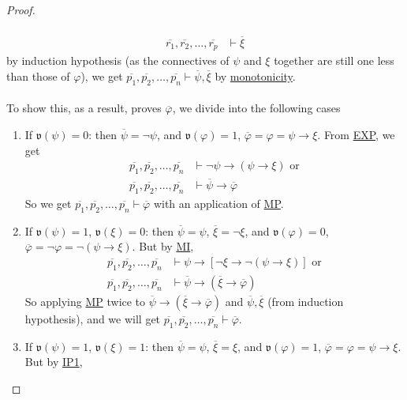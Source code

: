 \documentclass{treatise}
\begin{document}
\begin{proof}
\begin{enumerate}
\begin{align*}
        \\
        \overline{r_1}, \overline{r_2}, \hdots, \overline{r_p} & \vdash \overline{\xi}
    \end{align*}
    by induction hypothesis (as the connectives of $\psi$ and $\xi$ together are still one less than those of $\varphi$), we get $\overline{p_1}, \overline{p_2}, \hdots, \overline{p_n} \vdash \overline{\psi}, \overline{\xi}$ by \hyperref[logic-proof-props]{monotonicity}.
    \\
    \\
    To show this, as a result, proves $\overline{\varphi}$, we divide into the following cases
    \begin{enumerate}
        \item If $\mathfrak{v}(\psi) = 0$: then $\overline{\psi} = \neg \psi$, and $\mathfrak{v}(\varphi) = 1$, $\overline{\varphi} = \varphi = \psi \to \xi$. From \hyperref[HPL-T-EXP]{EXP}, we get
        \begin{align*}
            \overline{p_1}, \overline{p_2}, \hdots, \overline{p_n} & \vdash \neg \psi \to (\psi \to \xi) \mbox{ or}
            \\
            \overline{p_1}, \overline{p_2}, \hdots, \overline{p_n} & \vdash \overline{\psi} \to \overline{\varphi}
        \end{align*}
        So we get $\overline{p_1}, \overline{p_2}, \hdots, \overline{p_n} \vdash \overline{\varphi}$ with an application of \hyperref[HPL-R-MP]{MP}.
        \item If $\mathfrak{v}(\psi) = 1$, $\mathfrak{v}(\xi) = 0$: then $\overline{\psi} = \psi$, $\overline{\xi} = \neg \xi$, and $\mathfrak{v}(\varphi) = 0$, $\overline{\varphi} = \neg \varphi = \neg (\psi \to \xi)$. But by \hyperref[HPL-T-MI]{MI},
        \begin{align*}
            \overline{p_1}, \overline{p_2}, \hdots, \overline{p_n} & \vdash \psi \to [\neg \xi \to \neg (\psi \to \xi)] \mbox{ or}
            \\
            \overline{p_1}, \overline{p_2}, \hdots, \overline{p_n} & \vdash \overline{\psi} \to (\overline{\xi} \to \overline{\varphi})
        \end{align*}
        So applying \hyperref[HPL-R-MP]{MP} twice to $\overline{\psi} \to (\overline{\xi} \to \overline{\varphi})$ and $\overline{\psi}, \overline{\xi}$ (from induction hypothesis), and we will get $\overline{p_1}, \overline{p_2}, \hdots, \overline{p_n} \vdash \overline{\varphi}$.
        \item If $\mathfrak{v}(\psi) = 1$, $\mathfrak{v}(\xi) = 1$: then $\overline{\psi} = \psi$, $\overline{\xi} = \xi$, and $\mathfrak{v}(\varphi) = 1$, $\overline{\varphi} = \varphi = \psi \to \xi$. But by \hyperref[HPL-A-IP1]{IP1},

\end{enumerate}
\end{enumerate}
\end{proof}
\end{document}
